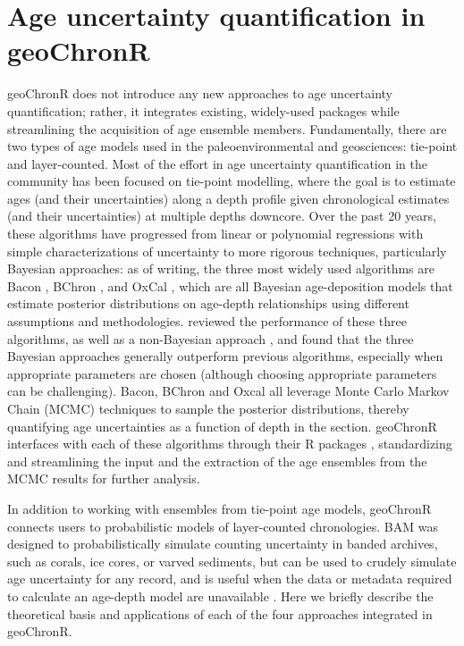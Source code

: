 \documentclass[gchron, manuscript]{copernicus}
\begin{document}
\hypertarget{sec:age-modeling}{%
\section{Age uncertainty quantification in
geoChronR}\label{sec:age-modeling}}

geoChronR does not introduce any new approaches to age uncertainty
quantification; rather, it integrates existing, widely-used packages
while streamlining the acquisition of age ensemble members.
Fundamentally, there are two types of age models used in the
paleoenvironmental and geosciences: tie-point and layer-counted. Most of
the effort in age uncertainty quantification in the community has been
focused on tie-point modelling, where the goal is to estimate ages (and
their uncertainties) along a depth profile given chronological estimates
(and their uncertainties) at multiple depths downcore. Over the past 20
years, these algorithms have progressed from linear or polynomial
regressions with simple characterizations of uncertainty
\citep{Heegaard2005, Blaauw2010CLAM} to more rigorous techniques,
particularly Bayesian approaches: as of writing, the three most widely
used algorithms are Bacon \citep{Blaauw2011BACON}, BChron
\citep{parnell2008flexible}, and OxCal \citep{ramsey2008deposition},
which are all Bayesian age-deposition models that estimate posterior
distributions on age-depth relationships using different assumptions and
methodologies. \citet{trachsel2017} reviewed the performance of these
three algorithms, as well as a non-Bayesian approach
\citep{Blaauw2010CLAM}, and found that the three Bayesian approaches
generally outperform previous algorithms, especially when appropriate
parameters are chosen (although choosing appropriate parameters can be
challenging). Bacon, BChron and Oxcal all leverage Monte Carlo Markov
Chain (MCMC) techniques to sample the posterior distributions, thereby
quantifying age uncertainties as a function of depth in the section.
geoChronR interfaces with each of these algorithms through their R
packages \citep{parnell2008flexible, baconPackage, oxcAAR},
standardizing and streamlining the input and the extraction of the age
ensembles from the MCMC results for further analysis.

In addition to working with ensembles from tie-point age models,
geoChronR connects users to probabilistic models of layer-counted
chronologies. BAM \citep{BAM} was designed to probabilistically simulate
counting uncertainty in banded archives, such as corals, ice cores, or
varved sediments, but can be used to crudely simulate age uncertainty
for any record, and is useful when the data or metadata required to
calculate an age-depth model are unavailable
\citep[e.g.][]{kaufman2020HoloceneGMST}. Here we briefly describe the
theoretical basis and applications of each of the four approaches
integrated in geoChronR.
\end{document}
